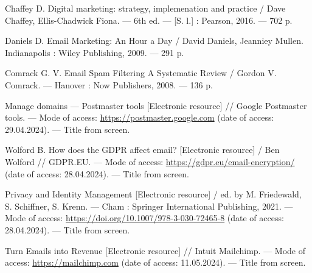 \begin{thebibliography}    
    Chaffey D. Digital marketing: strategy, implemenation and practice / Dave Chaffey, Ellis-Chadwick Fiona. --- 6th ed. --- [S. l.] : Pearson, 2016. --- 702 p.
    
    Daniels D. Email Marketing: An Hour a Day / David Daniels, Jeanniey Mullen. Indianapolis : Wiley Publishing, 2009. --- 291 p.
    
    Comrack G. V. Email Spam Filtering A Systematic Review / Gordon V. Comrack. --- Hanover : Now Publishers, 2008. --- 136 p.
    
    Manage domains --- Postmaster tools [Electronic resource] // Google Postmaster tools. --- Mode of access: \url{https://postmaster.google.com} (date of access: 29.04.2024). --- Title from screen.
    
    Wolford B. How does the GDPR affect email? [Electronic resource] / Ben Wolford // GDPR.EU. --- Mode of access: \url{https://gdpr.eu/email-encryption/} (date of access: 28.04.2024). --- Title from screen.
    
    Privacy and Identity Management [Electronic resource] / ed. by M. Friedewald, S. Schiffner, S. Krenn. --- Cham : Springer International Publishing, 2021. --- Mode of access: \url{https://doi.org/10.1007/978-3-030-72465-8} (date of access: 28.04.2024). --- Title from screen.
    
    Turn Emails into Revenue [Electronic resource] // Intuit Mailchimp. --- Mode of access: \url{https://mailchimp.com} (date of access: 11.05.2024). --- Title from screen.

 
\end{thebibliography}
